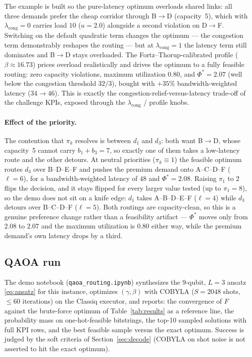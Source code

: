 \documentclass[11pt]{article}
\newcommand{\cng}{\mathrm{cong}}
\begin{document}
The example is built so the pure-latency optimum overloads shared links: all
three demands prefer the cheap corridor through B$\to$D (capacity~5), which
with $\lambda_{\cng} = 0$ carries load $10$ ($u = 2.0$) alongside a second
violation on D$\to$F. Switching on the default quadratic term changes the
optimum --- the congestion term demonstrably reshapes the routing --- but at
$\lambda_{\cng} = 1$ the latency term still dominates and B$\to$D stays
overloaded. The Fortz--Thorup-calibrated profile ($\beta \approx 16.73$)
prices overload realistically and drives the optimum to a fully feasible
routing: zero capacity violations, maximum utilization $0.80$, and
$\Phi^{*} = 2.07$ (well below the congestion threshold $32/3$), bought with
$+35\%$ bandwidth-weighted latency ($34 \to 46$). This is exactly the
congestion-relief-versus-latency trade-off of the challenge KPIs, exposed
through the $\lambda_{\cng}$ / profile knobs.

\paragraph{Effect of the priority.}
The contention that $\pi_k$ resolves is between $d_1$ and $d_3$: both want
B$\to$D, whose capacity~5 cannot carry $b_1 + b_3 = 7$, so exactly one of them
takes a low-latency route and the other detours. At neutral priorities
($\pi_k \equiv 1$) the feasible optimum routes $d_3$ over B--D--E--F and pushes
the premium demand onto A--C--D--F ($\ell = 6$), for a bandwidth-weighted
latency of $48$ and $\Phi^{*} = 2.08$. Raising $\pi_1$ to $2$ flips the
decision, and it stays flipped for every larger value tested (up to $\pi_1 =
8$), so the demo does not sit on a knife edge: $d_1$ takes A--B--D--E--F
($\ell = 4$) while $d_3$ detours over B--C--D--F ($\ell = 5$). Both routings
are capacity-clean, so this is a genuine preference change rather than a
feasibility artifact --- $\Phi^{*}$ moves only from $2.08$ to $2.07$ and the
maximum utilization is $0.80$ either way, while the premium demand's own
latency drops by a third.

\subsection{QAOA run}

The demo notebook (\texttt{qaoa\_routing.ipynb}) synthesizes the 9-qubit,
$L = 3$ ansatz \eqref{eq:ansatz} for this instance, optimizes
$(\gamma, \beta)$ with COBYLA ($S = 2048$ shots, $\le 60$ iterations) on the
Classiq executor, and reports: the convergence of $F$ against the
brute-force optimum of Table~\ref{tab:results} as a reference line, the
probability mass on one-hot-feasible bitstrings, the top-10 sampled solutions
with full KPI rows, and the best feasible sample versus the exact optimum.
Success is judged by the soft criteria of Section~\ref{sec:decode} (COBYLA on
shot noise is not asserted to hit the exact optimum).
\end{document}
